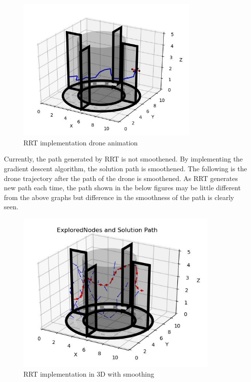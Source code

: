 \documentclass{IEEEtran}
\begin{document}
 \begin{figure}[h]
    \centering
    \includegraphics[width=9cm]{rrt3ddrone}
    \caption{RRT implementation drone animation}
    \label{fig:RRT implementation drone animation}
\end{figure}
\newline 
Currently, the path generated by RRT is not smoothened. By implementing the gradient descent algorithm, the solution path is smoothened. The following is the drone trajectory after the path of the drone is smoothened. As RRT generates new path each time, the path shown in the below figures may be little different from the above graphs but difference in the smoothness of the path is clearly seen.
\newpage
\begin{figure}[h]
    \centering
    \includegraphics[width=10cm]{rrt3dsmooth}
    \caption{RRT implementation in 3D with smoothing}
    \label{fig:RRT implementation in 3D with smoothing}
\end{figure}
\end{document}
